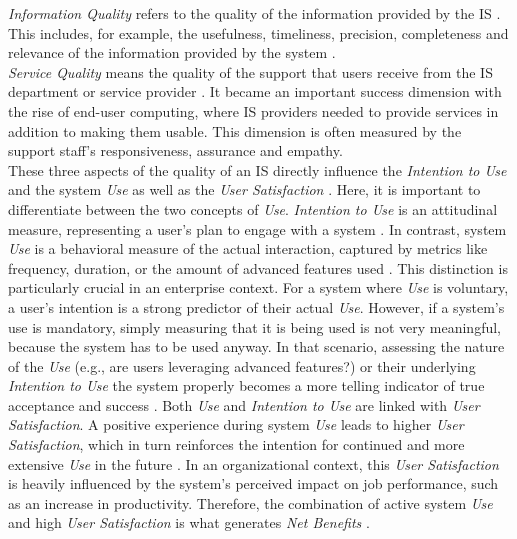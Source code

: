 \documentclass[
	english,
	ruledheaders=section,%
	class=report,%
	thesis={type=bachelor},%
	accentcolor=1b,%
	custommargins=true,%
	marginpar=false,%
	parskip=half-,%
	fontsize=11pt,%
	DIV=14,
]{tudapub}
\begin{document}
\textit{Information Quality} refers to the quality of the information provided by the IS \parencite[p.~64]{DeloneMcLean1992ISSuccess}. This includes, for example, the usefulness, timeliness, precision, completeness and relevance of the information provided by the system \parencite[p.~67]{DeloneMcLean1992ISSuccess}.\\
\textit{Service Quality} means the quality of the support that users receive from the IS department or service provider \parencite[p.~18]{DeloneMcLean2003ISSuccessTenYearUpdate}. It became an important success dimension with the rise of end-user computing, where IS providers needed to provide services in addition to making them usable. This dimension is often measured by the support staff's responsiveness, assurance and empathy.
\\
These three aspects of the quality of an IS directly influence the \textit{Intention to Use} and the system \textit{Use} as well as the \textit{User Satisfaction} \parencite[p.~23--24]{DeloneMcLean2003ISSuccessTenYearUpdate}. Here, it is important to differentiate between the two concepts of \textit{Use}. \textit{Intention to Use} is an attitudinal measure, representing a user's plan to engage with a system \parencite[p.~23]{DeloneMcLean2003ISSuccessTenYearUpdate}. In contrast, system \textit{Use} is a behavioral measure of the actual interaction, captured by metrics like frequency, duration, or the amount of advanced features used \parencite[p.~66]{DeloneMcLean1992ISSuccess}. This distinction is particularly crucial in an enterprise context. For a system where \textit{Use} is voluntary, a user's intention is a strong predictor of their actual \textit{Use}. However, if a system's use is mandatory, simply measuring that it is being used is not very meaningful, because the system has to be used anyway. In that scenario, assessing the nature of the \textit{Use} (e.g., are users leveraging advanced features?) or their underlying \textit{Intention to Use} the system properly becomes a more telling indicator of true acceptance and success
\parencite[p.~66]{DeloneMcLean1992ISSuccess}. Both \textit{Use} and \textit{Intention to Use} are linked with \textit{User Satisfaction}. A positive experience during system \textit{Use} leads to higher \textit{User Satisfaction}, which in turn reinforces the intention for continued and more extensive \textit{Use} in the future \parencite[p.~23]{DeloneMcLean2003ISSuccessTenYearUpdate}. In an organizational context, this \textit{User Satisfaction} is heavily influenced by the system's perceived impact on job performance, such as an increase in productivity. Therefore, the combination of active system \textit{Use} and high \textit{User Satisfaction} is what generates \textit{Net Benefits} \parencite[p.~23]{DeloneMcLean2003ISSuccessTenYearUpdate}.\\
\end{document}
